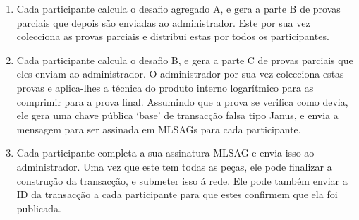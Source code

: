 \begin{enumerate}
    \item Cada participante calcula o desafio agregado A, e gera a parte B de provas parciais que depois são enviadas ao administrador. Este por sua vez colecciona as provas parciais e distribui estas por todos os participantes.
    \item Cada participante calcula o desafio B, e gera a parte C de provas parciais que eles enviam ao administrador. O administrador por sua vez colecciona estas provas e aplica-lhes a técnica do produto interno logarítmico para as comprimir para a prova final. Assumindo que a prova se verifica como devia, ele gera uma chave pública `base' de transacção falsa tipo Janus, e envia a mensagem para ser assinada em MLSAGs para cada participante.
    \item Cada participante completa a sua assinatura MLSAG e envia isso ao administrador. Uma vez que este tem todas as peças, ele pode finalizar a construção da transacção, e submeter isso á rede. Ele pode também enviar a ID da transacção a cada participante para que estes confirmem que ela foi publicada.
\end{enumerate}{}
